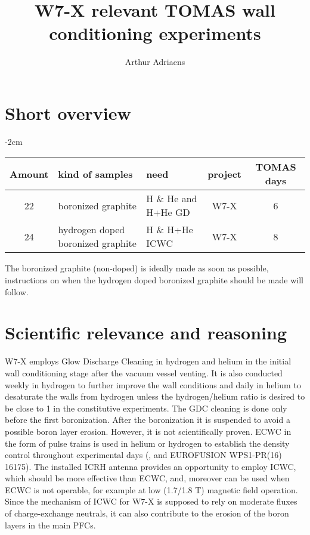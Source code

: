 \documentclass{article}
\title{W7-X relevant TOMAS wall conditioning experiments}
\author{Arthur Adriaens}
\begin{document}
\maketitle

\section{Short overview}
\begin{center}
    \addtolength{\leftskip} {-2cm} %
    \addtolength{\rightskip}{-2cm}
    \begin{tabular}{||c p{4cm} p{4cm} c c||}
         \hline
         Amount & kind of samples & need & project & TOMAS days \\ [0.5ex]
         \hline\hline
         22 & boronized graphite & H \& He and H+He GD & W7-X & 6 \\
         24 & hydrogen doped boronized graphite & H \& H+He ICWC & W7-X & 8 \\
         \hline
    \end{tabular}
\end{center}
The boronized graphite (non-doped) is ideally made as soon as possible,
instructions on when the hydrogen doped boronized graphite should be made will
follow.
\section{Scientific relevance and reasoning}
W7-X  employs Glow Discharge Cleaning in hydrogen and helium in the initial
wall conditioning  stage after the vacuum vessel venting. It is also conducted
weekly in hydrogen to further improve the wall conditions and daily in helium
to desaturate the walls from hydrogen\cite{AndreiNucMatEn} unless the
hydrogen/helium ratio is desired to be close to 1 in the constitutive
experiments. The GDC cleaning is done only before the first boronization. After
the boronization it is suspended to avoid a possible boron layer erosion.
However, it is not scientifically proven. ECWC in the form of pulse trains is
used in helium or hydrogen to establish the density control throughout
experimental days (\cite{Goriaev_2020},\cite{WAUTERS2018235} and
EUROFUSION WPS1-PR(16) 16175). The installed ICRH antenna provides an opportunity to
employ ICWC, which should be more effective than ECWC, and, moreover can be used when
ECWC is not operable, for example at low (1.7/1.8 T) magnetic field operation.
Since the mechanism of ICWC for W7-X is supposed to rely on moderate fluxes of
charge-exchange neutrals, it can also contribute to the erosion of the boron
layers in the main PFCs.
\end{document}
